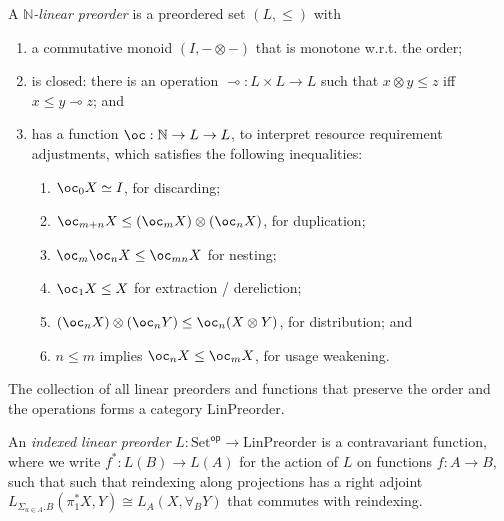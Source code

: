 \documentclass[acmsmall,review,screen,anonymous]{acmart}
\newcommand{\Set}{\mathrm{Set}}
\newcommand{\op}{\mathsf{op}}
\newcommand{\LinPreorder}{\mathrm{LinPreorder}}
\begin{document}
\begin{definition}\label{def:indexed-linear-preorder}
  A \emph{$\mathbb{N}$-linear preorder} is a preordered set
  $(L, \leq)$ with
  \begin{enumerate}
  \item a commutative monoid $(I, -\otimes-)$ that is monotone
    w.r.t. the order;
  \item is closed: there is an operation
    $\multimap : L \times L \to L$ such that $x \otimes y \leq z$ iff
    $x \leq y \multimap z$; and
  \item has a function $\oc : \mathbb{N} \to L \to L$, to interpret
    resource requirement adjustments, which satisfies the following
    inequalities:
    \begin{enumerate}
    \item $\oc_0 X \simeq I$, for discarding;
    \item $\oc_{m+n} X \leq (\oc_m X) \otimes (\oc_n X)$, for duplication;
    \item $\oc_m\oc_n X \leq \oc_{mn} X$ for nesting;
    \item $\oc_1 X \leq X$ for extraction / dereliction;
    \item $(\oc_n X) \otimes (\oc_n Y) \leq \oc_n(X \otimes Y)$, for distribution; and
    \item $n \leq m$ implies $\oc_n X \leq \oc_m X$, for usage weakening.
    \end{enumerate}
  \end{enumerate}
  The collection of all linear preorders and functions that preserve the
  order and the operations forms a category $\LinPreorder$.

  An \emph{indexed linear preorder} $L : \Set^\op \to \LinPreorder$ is
  a contravariant function, where we write $f^* : L(B) \to L(A)$ for
  the action of $L$ on functions $f : A \to B$, such that such that
  reindexing along projections has a right adjoint
  $L_{\Sigma_{a \in A}.B}(\pi_1^*X, Y) \cong L_{A}(X, \forall_B Y)$
  that commutes with reindexing.
\end{definition}
\end{document}
